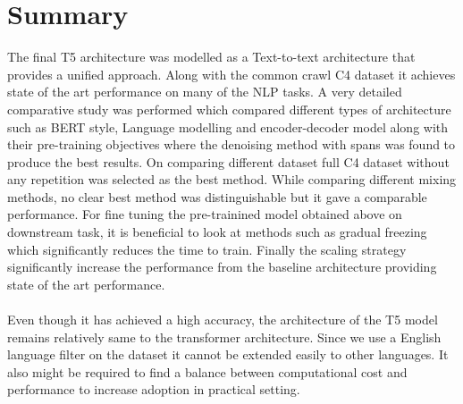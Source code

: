 \section{Summary}
The final T5 architecture was modelled as a Text-to-text architecture that provides a unified approach. Along with the common crawl C4 dataset it achieves state of the art performance on many of the NLP tasks. A very detailed comparative study was performed which compared different types of architecture such as BERT style, Language modelling and encoder-decoder model along with their pre-training objectives where the denoising method with spans was found to produce the best results. On comparing different dataset full C4 dataset without any repetition was selected as the best method. While comparing different mixing methods, no clear best method was distinguishable but it gave a comparable performance. For fine tuning the pre-trainined model obtained above on downstream task, it is beneficial to look at methods such as gradual freezing which significantly reduces the time to train. Finally the scaling strategy significantly increase the performance from the baseline architecture providing state of the art performance. \\\\
Even though it has achieved a high accuracy, the architecture of the T5 model remains relatively same to the transformer architecture. Since we use a English language filter on the dataset it cannot be extended easily to other languages. It also might be required to find a balance between computational cost and performance to increase adoption in practical setting. 